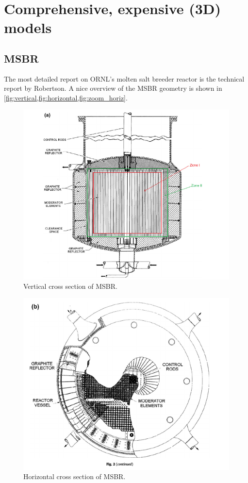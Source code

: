 \documentclass{article}
\begin{document}
\section{Comprehensive, expensive (3D) models}
\subsection{MSBR}

The most detailed report on ORNL's molten salt breeder reactor is the technical
report by Robertson. \cite{robertson1971conceptual} A nice overview of the MSBR
geometry is shown in \cref{fig:vertical,fig:horizontal,fig:zoom_horiz}.

\begin{figure}[htpb]
  \centering
  \includegraphics{vertical_MSBR_cross_section.png}
  \caption{Vertical cross section of MSBR.}
  \label{fig:vertical}
\end{figure}
\begin{figure}[htpb]
  \centering
  \includegraphics{horizontal_MSBR_cross_section.png}
  \caption{Horizontal cross section of MSBR.}
  \label{fig:horizontal}
\end{figure}
\end{document}

